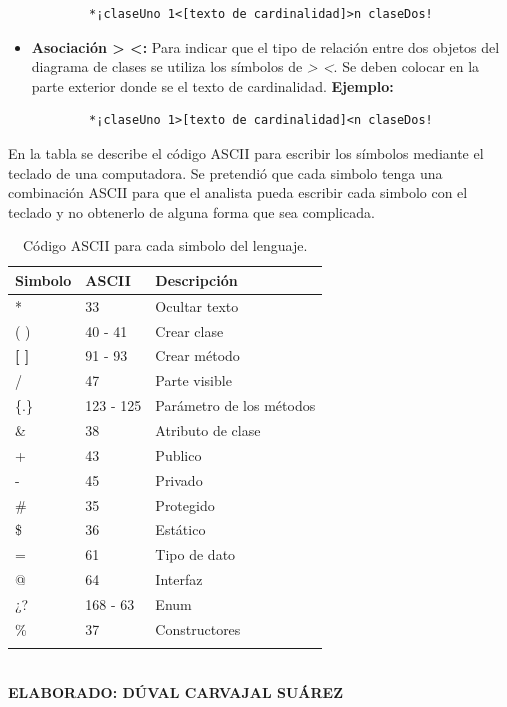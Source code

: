 \begin{itemize}
	\begin{verbatim}
		*¡claseUno 1<[texto de cardinalidad]>n claseDos!
	\end{verbatim}

	\item \textbf{Asociación > <:} Para indicar que el tipo de relación entre dos objetos del diagrama de clases se utiliza los símbolos de \textit{> <}. Se deben colocar en la parte exterior donde se el texto de cardinalidad. \textbf{Ejemplo:}
	
	\begin{verbatim}
		*¡claseUno 1>[texto de cardinalidad]<n claseDos!
	\end{verbatim}
	
\end{itemize}

En la tabla se describe el código ASCII para escribir los símbolos mediante el teclado de una computadora. Se pretendió que cada simbolo tenga una combinación ASCII para que el analista pueda escribir cada simbolo con el teclado y no obtenerlo de alguna forma que sea complicada.

\begin{table}[h!]
	\caption{Código ASCII para cada simbolo del lenguaje.}
	\begin{tabular}{p{2cm}p{4cm}p{5cm}}
		\toprule
		\textbf{Simbolo} & \textbf{ASCII} & \textbf{Descripción} \\
		\midrule
		* & 33 & Ocultar texto \\
		\addlinespace
		( ) & 40 - 41 & Crear clase \\
		\addlinespace
		\textbf{[ ]} & 91 - 93 & Crear método \\
		\addlinespace
		/ & 47 & Parte visible \\
		\addlinespace
		\{.\} & 123 - 125	 & Parámetro de los métodos \\
		\addlinespace 	
		\& & 38 & Atributo de clase \\
		\addlinespace
		+ & 43 & Publico \\
		\addlinespace
		- & 45 & Privado \\
		\addlinespace
		\# & 35 & Protegido \\
		\addlinespace
		\$ & 36 & Estático \\
		\addlinespace
		= & 61 & Tipo de dato \\
		\addlinespace
		@ & 64 & Interfaz \\
		\addlinespace
		¿? & 168 - 63 & Enum \\
		\addlinespace
		\% & 37 & Constructores \\
		\addlinespace
		\bottomrule
	\end{tabular}
	\textbf{ \\ ELABORADO: DÚVAL CARVAJAL SUÁREZ}
\end{table}

